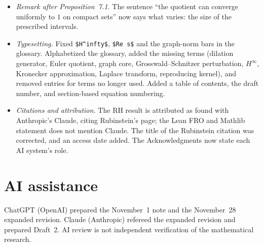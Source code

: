 \documentclass[12pt,letterpaper]{article}
\begin{document}
\begin{itemize}
\item \emph{Remark after Proposition~7.1.}  The sentence ``the quotient
  can converge uniformly to $1$ on compact sets'' now says what varies: the
  size of the prescribed intervals.
\item \emph{Typesetting.}  Fixed \verb|$H^infty$|, \verb|$Re s$| and the
  graph-norm bars in the glossary.  Alphabetized the glossary, added the
  missing terms (dilation generator, Euler quotient, graph core,
  Grosswald--Schnitzer perturbation, $H^\infty$, Kronecker approximation,
  Laplace transform, reproducing kernel), and removed entries for terms
  no longer used.  Added a table of contents, the draft number, and
  section-based equation numbering.
\item \emph{Citations and attribution.}  The RH result is attributed as
  found with Anthropic's Claude, citing Rubinstein's page; the Lean FRO and
  Mathlib statement does not mention Claude.  The title of the Rubinstein
  citation was corrected, and an access date added.  The Acknowledgments
  now state each AI system's role.
\end{itemize}

\section{AI assistance}
ChatGPT (OpenAI) prepared the November~1 note and the November~28
expanded revision.  Claude (Anthropic) refereed the expanded revision and
prepared Draft~2.  AI review is not independent verification of the
mathematical research.
\end{document}
